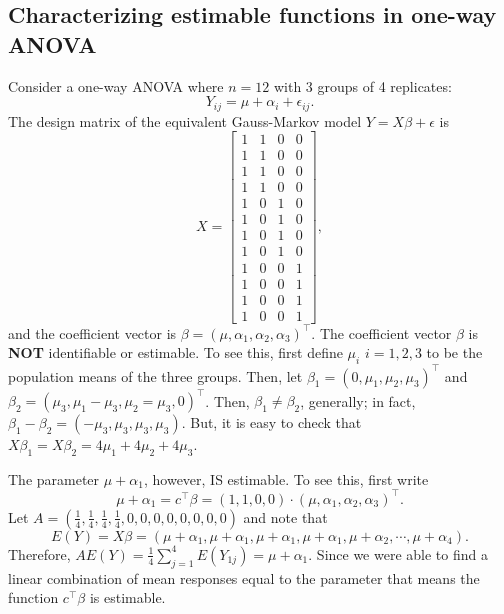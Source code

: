 \documentclass[
]{book}
\begin{document}
\hypertarget{characterizing-estimable-functions-in-one-way-anova}{%
\subsection{Characterizing estimable functions in one-way ANOVA}\label{characterizing-estimable-functions-in-one-way-anova}}

Consider a one-way ANOVA where \(n=12\) with 3 groups of 4 replicates:
\[Y_{ij} = \mu + \alpha_i + \epsilon_{ij}.\]
The design matrix of the equivalent Gauss-Markov model \(Y = X\beta+\epsilon\) is
\[X = \begin{bmatrix}
1 & 1 & 0 & 0 \\
1 & 1 & 0 & 0 \\
1 & 1 & 0 & 0 \\
1 & 1 & 0 & 0 \\
1 & 0 & 1 & 0 \\
1 & 0 & 1 & 0 \\
1 & 0 & 1 & 0 \\
1 & 0 & 1 & 0 \\
1 & 0 & 0 & 1 \\
1 & 0 & 0 & 1 \\
1 & 0 & 0 & 1 \\
1 & 0 & 0 & 1 
\end{bmatrix},\]
and the coefficient vector is \(\beta = (\mu,\alpha_1, \alpha_2, \alpha_3)^\top\).
The coefficient vector \(\beta\) is \textbf{NOT} identifiable or estimable. To see this, first define \(\mu_i\) \(i=1,2,3\) to be the population means of the three groups. Then, let \(\beta_1 = (0,\mu_1, \mu_2, \mu_3)^\top\) and \(\beta_2 = (\mu_3, \mu_1 - \mu_3, \mu_2 = \mu_3, 0)^\top\). Then, \(\beta_1 \ne \beta_2\), generally; in fact, \(\beta_1 - \beta_2 = (-\mu_3, \mu_3, \mu_3, \mu_3)\). But, it is easy to check that \(X\beta_1 = X\beta_2 = 4\mu_1+4\mu_2+4\mu_3\).

The parameter \(\mu + \alpha_1\), however, IS estimable. To see this, first write
\[\mu+\alpha_1 = c^\top \beta = (1,1,0,0)\cdot (\mu, \alpha_1, \alpha_2, \alpha_3)^\top.\]
Let \(A = (\tfrac14, \tfrac14, \tfrac14, \tfrac14, 0,0,0,0,0,0,0,0)\) and note that
\[E(Y) = X\beta = (\mu+\alpha_1, \mu+\alpha_1, \mu+\alpha_1, \mu+\alpha_1, \mu+\alpha_2,\cdots, \mu+\alpha_4).\]
Therefore, \(AE(Y) = \tfrac14\sum_{j=1}^4 E(Y_{1j}) = \mu+\alpha_1\). Since we were able to find a linear combination of mean responses equal to the parameter that means the function \(c^\top \beta\) is estimable.
\end{document}
